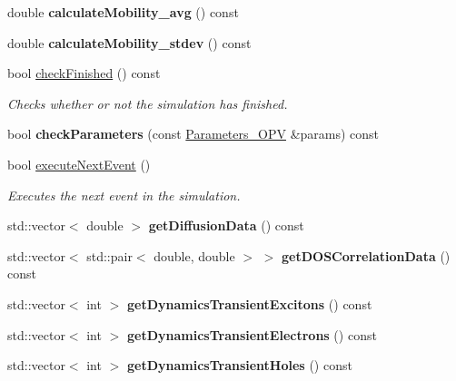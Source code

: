 \begin{DoxyCompactItemize}
double {\bfseries calculate\+Mobility\+\_\+avg} () const
\item 
\mbox{\label{class_o_s_c___sim_a7cbca947933286e632d3d76dfed403bf}} 
double {\bfseries calculate\+Mobility\+\_\+stdev} () const
\item 
bool \hyperlink{class_o_s_c___sim_ab3e4258c850b48ec02e4d3a88b583115}{check\+Finished} () const
\begin{DoxyCompactList}\small\item\em Checks whether or not the simulation has finished. \end{DoxyCompactList}\item 
\mbox{\label{class_o_s_c___sim_a92f8e2ae6bcd3e0755feb2419849c8e9}} 
bool {\bfseries check\+Parameters} (const \hyperlink{struct_parameters___o_p_v}{Parameters\+\_\+\+O\+PV} \&params) const
\item 
bool \hyperlink{class_o_s_c___sim_a41bdb6368c71e1a3cb0efdc2a55d7869}{execute\+Next\+Event} ()
\begin{DoxyCompactList}\small\item\em Executes the next event in the simulation. \end{DoxyCompactList}\item 
\mbox{\label{class_o_s_c___sim_a97f04719b91c90ac64dd8186476aa5f5}} 
std\+::vector$<$ double $>$ {\bfseries get\+Diffusion\+Data} () const
\item 
\mbox{\label{class_o_s_c___sim_a804f8facf0f5ee86d0234662a0719571}} 
std\+::vector$<$ std\+::pair$<$ double, double $>$ $>$ {\bfseries get\+D\+O\+S\+Correlation\+Data} () const
\item 
\mbox{\label{class_o_s_c___sim_a16f5ce34d8cb54220ce09998e6dff46f}} 
std\+::vector$<$ int $>$ {\bfseries get\+Dynamics\+Transient\+Excitons} () const
\item 
\mbox{\label{class_o_s_c___sim_a53be32d48cc8319af6143fe858b3840f}} 
std\+::vector$<$ int $>$ {\bfseries get\+Dynamics\+Transient\+Electrons} () const
\item 
\mbox{\label{class_o_s_c___sim_ad6bffe074bd5e2c5b2f08561fa8bf117}} 
std\+::vector$<$ int $>$ {\bfseries get\+Dynamics\+Transient\+Holes} () const

\end{DoxyCompactItemize}
